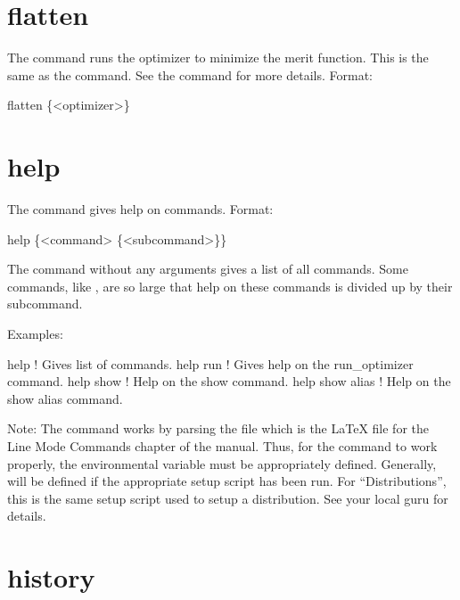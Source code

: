 \section{flatten}
\label{s:flatten}

The  command runs the optimizer to minimize the merit
function. This is the same as the  command. 
See the  command for more details.  Format:
\begin{example}
  flatten \{<optimizer>\}
\end{example}

\vskip 0.2in

\section{help}
\label{s:help}

The  command gives help on \tao commands. Format:
\begin{example}
  help \{<command> \{<subcommand>\}\}
\end{example}

\vskip 0.2in

The  command without any arguments gives a list of all commands.
Some commands, like , are so large that help on these commands
is divided up by their subcommand.

Examples:
\begin{example}
  help            ! Gives list of commands.
  help run        ! Gives help on the run_optimizer command.
  help show       ! Help on the show command.
  help show alias ! Help on the show alias command.
\end{example}

Note: The  command works by parsing the file
 which is the LaTeX file for the
Line Mode Commands chapter of the \tao manual. Thus, for the 
command to work properly, the environmental variable  must
be appropriately defined. Generally,  will be defined if
the appropriate setup script has been run. For ``Distributions'', this
is the same setup script used to setup a distribution. See your local
\bmad guru for details.

\section{history}
\label{s:history}

